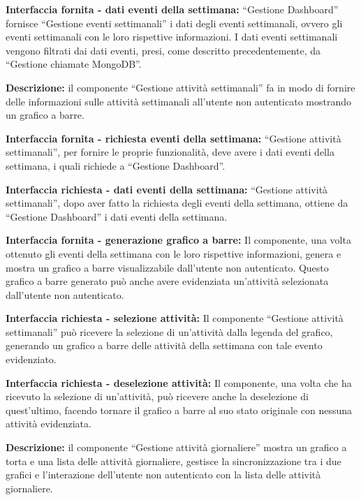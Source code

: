 \begin{listaPersonale}[]{}
    \textbf{Interfaccia fornita - dati eventi della settimana:} “Gestione Dashboard” fornisce  “Gestione eventi settimanali” i dati degli eventi settimanali, ovvero gli eventi settimanali con le loro rispettive informazioni. I dati eventi settimanali vengono filtrati dai dati eventi, presi, come descritto precedentemente, da “Gestione chiamate MongoDB”.



    \textbf{Descrizione:} il componente “Gestione attività settimanali” fa in modo di fornire delle informazioni sulle attività settimanali all'utente non autenticato mostrando un grafico a barre.

    \textbf{Interfaccia fornita - richiesta eventi della settimana:} “Gestione attività settimanali”, per fornire le proprie funzionalità, deve avere i dati eventi della settimana, i quali richiede a “Gestione Dashboard”.

    \textbf{Interfaccia richiesta - dati eventi della settimana:} “Gestione attività settimanali”, dopo aver fatto la richiesta degli eventi della settimana, ottiene da “Gestione Dashboard” i dati eventi della settimana.

    \textbf{Interfaccia fornita - generazione grafico a barre:} Il componente, una volta ottenuto gli eventi della settimana con le loro rispettive informazioni, genera e mostra un grafico a barre visualizzabile dall'utente non autenticato. Questo grafico a barre generato può anche avere evidenziata un'attività selezionata dall'utente non autenticato.

    \textbf{Interfaccia richiesta - selezione attività:} Il componente “Gestione attività settimanali” può ricevere la selezione di un'attività dalla legenda del grafico, generando un grafico a barre delle attività della settimana con tale evento evidenziato.

    \textbf{Interfaccia richiesta - deselezione attività:} Il componente, una volta che ha ricevuto la selezione di un'attività, può ricevere anche la deselezione di quest'ultimo, facendo tornare il grafico a barre al suo stato originale con nessuna attività evidenziata.



    \textbf{Descrizione:} il componente “Gestione attività giornaliere” mostra un grafico a torta e una lista delle attività giornaliere, gestisce la sincronizzazione tra i due grafici e l'interazione dell'utente non autenticato con la lista delle attività giornaliere.


\end{listaPersonale}

